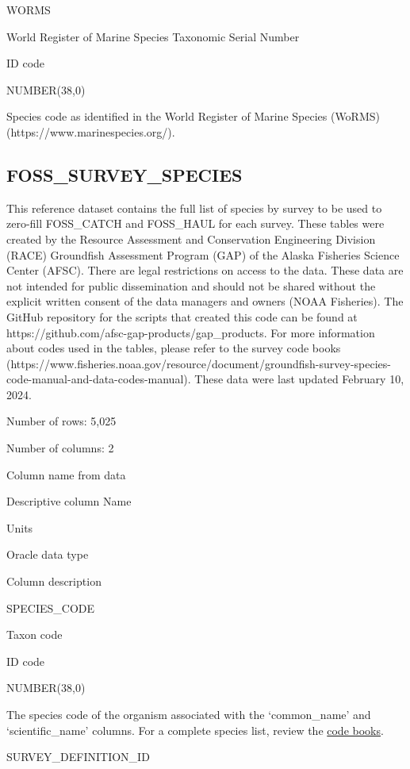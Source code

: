 \documentclass[
  letterpaper,
  oneside,
  open=any]{scrbook}
\begin{document}
WORMS

World Register of Marine Species Taxonomic Serial Number

ID code

NUMBER(38,0)

Species code as identified in the World Register of Marine Species
(WoRMS) (https://www.marinespecies.org/).

\hypertarget{foss_survey_species}{%
\subsection{FOSS\_SURVEY\_SPECIES}\label{foss_survey_species}}

This reference dataset contains the full list of species by survey to be
used to zero-fill FOSS\_CATCH and FOSS\_HAUL for each survey. These
tables were created by the Resource Assessment and Conservation
Engineering Division (RACE) Groundfish Assessment Program (GAP) of the
Alaska Fisheries Science Center (AFSC). There are legal restrictions on
access to the data. These data are not intended for public dissemination
and should not be shared without the explicit written consent of the
data managers and owners (NOAA Fisheries). The GitHub repository for the
scripts that created this code can be found at
https://github.com/afsc-gap-products/gap\_products. For more information
about codes used in the tables, please refer to the survey code books
(https://www.fisheries.noaa.gov/resource/document/groundfish-survey-species-code-manual-and-data-codes-manual).
These data were last updated February 10, 2024.

Number of rows: 5,025

Number of columns: 2

Column name from data

Descriptive column Name

Units

Oracle data type

Column description

SPECIES\_CODE

Taxon code

ID code

NUMBER(38,0)

The species code of the organism associated with the `common\_name' and
`scientific\_name' columns. For a complete species list, review the
\href{https://www.fisheries.noaa.gov/resource/document/groundfish-survey-species-code-manual-and-data-codes-manual}{code
books}.

SURVEY\_DEFINITION\_ID
\end{document}
